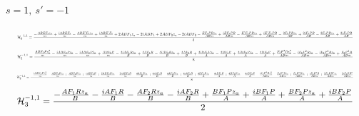 \documentclass[10pt]{article}
\begin{document}
\paragraph{$s=1,\ s'=-1$}
\begin{equation*}
\resizebox{0.98\textwidth}{!}{${\displaystyle \mathcal H^{-1,1}_0=\frac{- \frac{A B E F_2 z_a}{m} + \frac{i A B E F_2}{m} - \frac{A B E' F_2 z_a}{m} + \frac{i A B E' F_2}{m} + 2 A B F_1 z_a - 2 i A B F_1 + 2 A B F_2 z_a - 2 i A B F_2 - \frac{E F_2 P R z_a}{A B m} + \frac{i E F_2 P R}{A B m} - \frac{E' F_2 P R z_a}{A B m} + \frac{i E' F_2 P R}{A B m} - \frac{2 F_1 P R z_a}{A B} + \frac{2 i F_1 P R}{A B} - \frac{2 F_2 P R z_a}{A B} + \frac{2 i F_2 P R}{A B}}{4}}$}
\end{equation*}
\begin{equation*}
\resizebox{0.98\textwidth}{!}{${\displaystyle \mathcal H^{-1,1}_1=\frac{\frac{A B F_2 P z_a^{2}}{m} - \frac{i A B F_2 P z_a}{m} - \frac{i A B F_2 P \bar z_a}{m} + \frac{A B F_2 P}{m} - \frac{4 i A F_1 R z_a}{B} + \frac{4 A F_1 R}{B} - \frac{4 i A F_2 R z_a}{B} + \frac{4 A F_2 R}{B} + \frac{4 i B F_1 P z_a}{A} - \frac{4 B F_1 P}{A} + \frac{4 i B F_2 P z_a}{A} - \frac{4 B F_2 P}{A} + \frac{F_2 P^{2} R z_a^{2}}{A B m} - \frac{i F_2 P^{2} R z_a}{A B m} - \frac{i F_2 P^{2} R \bar z_a}{A B m} + \frac{F_2 P^{2} R}{A B m}}{8}}$}
\end{equation*}
\begin{equation*}
\resizebox{0.98\textwidth}{!}{${\displaystyle \mathcal H^{-1,1}_2=\frac{- \frac{i A B F_2 P z_a^{2}}{m} - \frac{A B F_2 P z_a}{m} + \frac{A B F_2 P \bar z_a}{m} + \frac{i A B F_2 P}{m} + \frac{2 A B F_2 R z_a}{m} - \frac{2 i A B F_2 R}{m} - \frac{4 A F_1 R z_a}{B} + \frac{4 i A F_1 R}{B} - \frac{4 A F_2 R z_a}{B} + \frac{4 i A F_2 R}{B} + \frac{4 B F_1 P z_a}{A} - \frac{4 i B F_1 P}{A} + \frac{4 B F_2 P z_a}{A} - \frac{4 i B F_2 P}{A} - \frac{i F_2 P^{2} R z_a^{2}}{A B m} - \frac{F_2 P^{2} R z_a}{A B m} + \frac{F_2 P^{2} R \bar z_a}{A B m} + \frac{i F_2 P^{2} R}{A B m} + \frac{2 F_2 P R^{2} z_a}{A B m} - \frac{2 i F_2 P R^{2}}{A B m}}{8}}$}
\end{equation*}
\begin{equation*}
\resizebox{0.98\textwidth}{!}{${\displaystyle \mathcal H^{-1,1}_3=\frac{- \frac{A F_1 R z_a}{B} - \frac{i A F_1 R}{B} - \frac{A F_2 R z_a}{B} - \frac{i A F_2 R}{B} + \frac{B F_1 P z_a}{A} + \frac{i B F_1 P}{A} + \frac{B F_2 P z_a}{A} + \frac{i B F_2 P}{A}}{2}}$}
\end{equation*}
\end{document}

